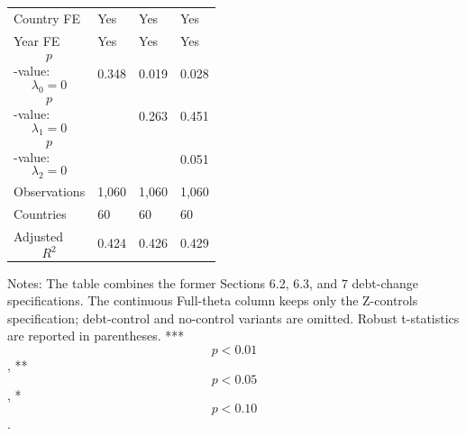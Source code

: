 \begin{table}[H]
\begin{threeparttable}
\begin{tabularx}{\textwidth}{lYYY}
Country FE & Yes & Yes & Yes \\
Year FE & Yes & Yes & Yes \\
$$p$$-value: $$\lambda_0=0$$ & 0.348 & 0.019 & 0.028 \\
$$p$$-value: $$\lambda_1=0$$ &  & 0.263 & 0.451 \\
$$p$$-value: $$\lambda_2=0$$ &  &  & 0.051 \\
Observations & 1,060 & 1,060 & 1,060 \\
Countries & 60 & 60 & 60 \\
Adjusted $$R^2$$ & 0.424 & 0.426 & 0.429 \\
\bottomrule
\end{tabularx}
\begin{tablenotes}[flushleft]\footnotesize
\item Notes: The table combines the former Sections 6.2, 6.3, and 7 debt-change specifications. The continuous Full-theta column keeps only the Z-controls specification; debt-control and no-control variants are omitted. Robust t-statistics are reported in parentheses. *** $$p<0.01$$, ** $$p<0.05$$, * $$p<0.10$$.
\end{tablenotes}
\end{threeparttable}
\end{table}
